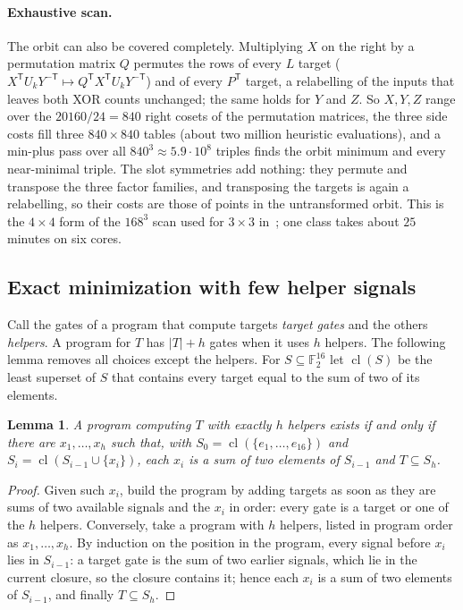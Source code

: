 \documentclass[11pt]{article}
\newtheorem{lemma}[theorem]{Lemma}
\theoremstyle{remark}
\newcommand{\F}{\mathbb{F}}
\begin{document}
\paragraph{Exhaustive scan.}  The orbit can also be covered completely.
Multiplying $X$ on the right by a permutation matrix $Q$ permutes the
rows of every $L$ target ($X^{\mathsf T}U_kY^{-\mathsf T}\mapsto
Q^{\mathsf T}X^{\mathsf T}U_kY^{-\mathsf T}$) and of every $P^{\mathsf T}$
target, a relabelling of the inputs that leaves both XOR counts
unchanged; the same holds for $Y$ and $Z$.  So $X,Y,Z$ range over the
$20160/24=840$ right cosets of the permutation matrices, the three side
costs fill three $840\times840$ tables (about two million heuristic
evaluations), and a min-plus pass over all $840^3\approx5.9\cdot10^8$
triples finds the orbit minimum and every near-minimal triple.  The slot
symmetries add nothing: they permute and transpose the three factor
families, and transposing the targets is again a relabelling, so their
costs are those of points in the untransformed orbit.  This is the
$4\times4$ form of the $168^3$ scan used for $3\times3$
in~\cite{Sidebottom26a}; one class takes about $25$ minutes on six
cores.

\subsection{Exact minimization with few helper signals}\label{sec:exact}

Call the gates of a program that compute targets \emph{target gates}
and the others \emph{helpers}.  A program for $T$ has $|T|+h$ gates
when it uses $h$ helpers.  The following lemma removes all choices
except the helpers.  For $S\subseteq\F_2^{16}$ let $\operatorname{cl}(S)$
be the least superset of $S$ that contains every target equal to the
sum of two of its elements.

\begin{lemma}\label{lem:closure}
A program computing $T$ with exactly $h$ helpers exists if and only if
there are $x_1,\dots,x_h$ such that, with
$S_0=\operatorname{cl}(\{e_1,\dots,e_{16}\})$ and
$S_i=\operatorname{cl}(S_{i-1}\cup\{x_i\})$, each $x_i$ is a sum of two
elements of $S_{i-1}$ and $T\subseteq S_h$.
\end{lemma}

\begin{proof}
Given such $x_i$, build the program by adding targets as soon as they
are sums of two available signals and the $x_i$ in order: every gate is
a target or one of the $h$ helpers.  Conversely, take a program with $h$
helpers, listed in program order as $x_1,\dots,x_h$.  By induction on
the position in the program, every signal before $x_i$ lies in
$S_{i-1}$: a target gate is the sum of two earlier signals, which lie
in the current closure, so the closure contains it; hence each $x_i$ is
a sum of two elements of $S_{i-1}$, and finally $T\subseteq S_h$.
\end{proof}
\end{document}
